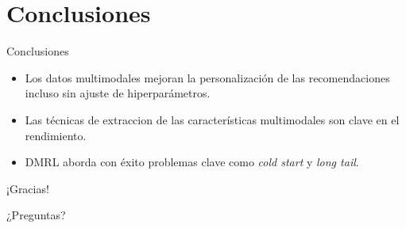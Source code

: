 \documentclass{beamer}
\begin{document}
\section{Conclusiones}
\begin{frame}{Conclusiones}
\pause
    \begin{itemize}
        \item Los datos multimodales mejoran la personalización de las recomendaciones incluso sin ajuste de hiperparámetros.
        \pause
        \item Las técnicas de extraccion de las características multimodales son clave en el rendimiento.
        \pause
        \item DMRL aborda con éxito problemas clave como \textit{cold start} y \textit{long tail}.
    \end{itemize}
\end{frame}

\begin{frame}{¡Gracias!}
    \begin{center}
        ¿Preguntas?
    \end{center}
\end{frame}
\end{document}
